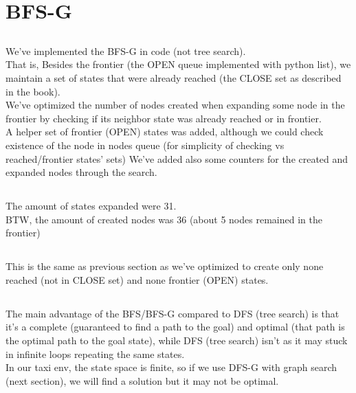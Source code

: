 \documentclass[12pt]{article}
\begin{document}
\section{BFS-G}

\subsection{}
We've implemented the BFS-G in code (not tree search).\\
That is, Besides the frontier (the OPEN queue implemented with python list), we maintain a set of states that were already reached (the CLOSE set as described in the book).\\
We've optimized the number of nodes created when expanding some node in the frontier by checking if its neighbor state was already reached or in frontier.\\
A helper set of frontier (OPEN) states was added, although we could check existence of the node in nodes queue (for simplicity of checking vs reached/frontier states' sets)
We've added also some counters for the created and expanded nodes through the search.\\

\subsection{}
The amount of states expanded were 31.\\
BTW, the amount of created nodes was 36 (about 5 nodes remained in the frontier)\\

\subsection{}
This is the same as previous section as we've optimized to create only none reached (not in CLOSE set) and none frontier (OPEN) states.

\subsection{}
The main advantage of the BFS/BFS-G compared to DFS (tree search) is that it's a complete (guaranteed to find a path to the goal) and optimal (that path is the optimal path to the goal state), while DFS (tree search) isn't as it may stuck in infinite loops repeating the same states.\\

In our taxi env, the state space is finite, so if we use DFS-G with graph search (next section), we will find a solution but it may not be optimal.\\
\end{document}
